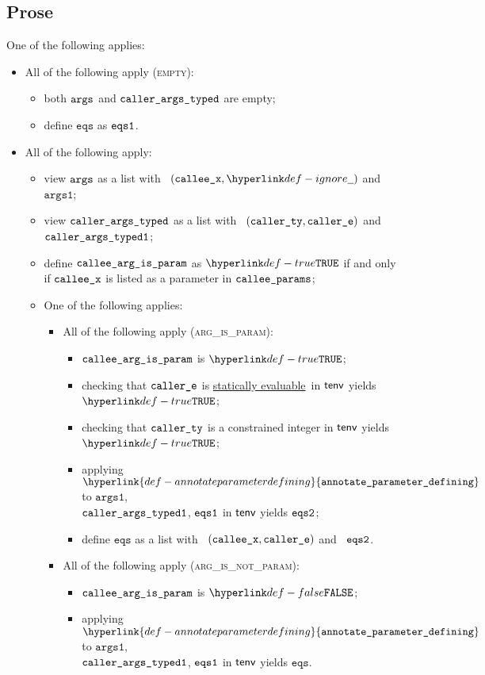 \documentclass{book}
\newcommand\ProseOrTypeError[0]{\ProseTerminateAs{\TypeErrorConfig}}
\newcommand\staticallyevaluable[0]{\hyperlink{def-staticallyevaluable}{statically evaluable}}
\newcommand\annotateparameterdefining[0]{\hyperlink{def-annotateparameterdefining}{\texttt{annotate\_parameter\_defining}}}
\newcommand\eqs[0]{\texttt{eqs}}
\newcommand\vargsone[0]{\texttt{args1}}
\begin{document}
\subsection{Prose}
One of the following applies:
\begin{itemize}
  \item All of the following apply (\textsc{empty}):
  \begin{itemize}
    \item both $\texttt{args}$ and $\texttt{caller\_args\_typed}$ are empty;
    \item define $\eqs$ as $\texttt{eqs1}$.
  \end{itemize}

  \item All of the following apply:
  \begin{itemize}
    \item view $\texttt{args}$ as a list with \head\ $(\calleex, \Ignore)$ and \tail\ $\vargsone$;
    \item view $\texttt{caller\_args\_typed}$ as a list with \head\ $(\texttt{caller\_ty}, \texttt{caller\_e})$ and \tail\ $\texttt{caller\_args\_typed1}$;
    \item define $\texttt{callee\_arg\_is\_param}$ as $\True$ if and only if $\texttt{callee\_x}$ is listed as a parameter in $\texttt{callee\_params}$;
    \item One of the following applies:
    \begin{itemize}
      \item All of the following apply (\textsc{arg\_is\_param}):
      \begin{itemize}
        \item $\texttt{callee\_arg\_is\_param}$ is $\True$;
        \item checking that $\texttt{caller\_e}$ is \staticallyevaluable\ in $\textsf{tenv}$ yields $\True$\ProseOrTypeError;
        \item checking that $\texttt{caller\_ty}$ is a constrained integer in $\textsf{tenv}$ yields \\
              $\True$\ProseOrTypeError;
        \item applying $\annotateparameterdefining$ to $\vargsone$, \\
              $\texttt{caller\_args\_typed1}$, $\texttt{eqs1}$ in $\textsf{tenv}$ yields $\texttt{eqs2}$\ProseOrTypeError;
        \item define $\eqs$ as a list with \head\ $(\texttt{callee\_x}, \texttt{caller\_e})$ and \tail\ $\texttt{eqs2}$.
      \end{itemize}

      \item All of the following apply (\textsc{arg\_is\_not\_param}):
      \begin{itemize}
        \item $\texttt{callee\_arg\_is\_param}$ is $\False$;
        \item applying $\annotateparameterdefining$ to $\vargsone$, \\
              $\texttt{caller\_args\_typed1}$, $\texttt{eqs1}$ in $\textsf{tenv}$ yields $\eqs$\ProseOrTypeError.
      \end{itemize}
    \end{itemize}
  \end{itemize}
\end{itemize}
\end{document}
